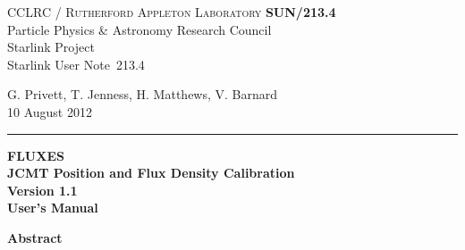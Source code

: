 \documentclass[11pt,twoside]{article}
\newcommand{\stardoccategory}  {Starlink User Note}
\newcommand{\stardocinitials}  {SUN}
\newcommand{\stardocnumber}    {213.4}
\newcommand{\stardocauthors}   {G. Privett, T. Jenness, H. Matthews, V. Barnard}
\newcommand{\stardocdate}      {10 August 2012}
\newcommand{\stardoctitle}     {FLUXES\\[1ex]
                                JCMT Position and Flux Density Calibration}
\newcommand{\stardocversion}   {Version 1.1}
\newcommand{\stardocmanual}    {User's Manual}
\newcommand{\stardocname}{\stardocinitials /\stardocnumber}
\newenvironment{latexonly}{}{}
\renewcommand{\_}{\texttt{\symbol{95}}}
\begin{document}
\thispagestyle{empty}

\begin{latexonly}
   CCLRC / \textsc{Rutherford Appleton Laboratory} \hfill \textbf{\stardocname}\\
   {\large Particle Physics \& Astronomy Research Council}\\
   {\large Starlink Project\\}
   {\large \stardoccategory\ \stardocnumber}
   \begin{flushright}
   \stardocauthors\\
   \stardocdate
   \end{flushright}
   \vspace{-4mm}
   \rule{\textwidth}{0.5mm}
   \vspace{5mm}
   \begin{center}
   {\Huge\textbf{\stardoctitle \\ [2.5ex]}}
   {\LARGE\textbf{\stardocversion \\ [4ex]}}
   {\Huge\textbf{\stardocmanual}}
   \end{center}
   \vspace{5mm}


   \vspace{10mm}
   \begin{center}
      {\Large\textbf{Abstract}}
   \end{center}
\end{latexonly}
\end{document}
